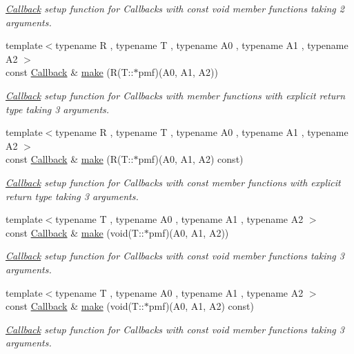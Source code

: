 \begin{DoxyCompactItemize}
\begin{DoxyCompactList}\small\item\em \hyperlink{class_d_d4hep_1_1_callback}{Callback} setup function for Callbacks with const void member functions taking 2 arguments. \item\end{DoxyCompactList}\item 
{\footnotesize template$<$typename R , typename T , typename A0 , typename A1 , typename A2 $>$ }\\const \hyperlink{class_d_d4hep_1_1_callback}{Callback} \& \hyperlink{class_d_d4hep_1_1_callback_a98ec440d07e402f58036a5699dfc2458}{make} (R(T::$\ast$pmf)(A0, A1, A2))
\begin{DoxyCompactList}\small\item\em \hyperlink{class_d_d4hep_1_1_callback}{Callback} setup function for Callbacks with member functions with explicit return type taking 3 arguments. \item\end{DoxyCompactList}\item 
{\footnotesize template$<$typename R , typename T , typename A0 , typename A1 , typename A2 $>$ }\\const \hyperlink{class_d_d4hep_1_1_callback}{Callback} \& \hyperlink{class_d_d4hep_1_1_callback_a747cb5a1ca93ae7b878dfc7e018d0e9b}{make} (R(T::$\ast$pmf)(A0, A1, A2) const)
\begin{DoxyCompactList}\small\item\em \hyperlink{class_d_d4hep_1_1_callback}{Callback} setup function for Callbacks with const member functions with explicit return type taking 3 arguments. \item\end{DoxyCompactList}\item 
{\footnotesize template$<$typename T , typename A0 , typename A1 , typename A2 $>$ }\\const \hyperlink{class_d_d4hep_1_1_callback}{Callback} \& \hyperlink{class_d_d4hep_1_1_callback_aa25f82768896694845261606a1ce386b}{make} (void(T::$\ast$pmf)(A0, A1, A2))
\begin{DoxyCompactList}\small\item\em \hyperlink{class_d_d4hep_1_1_callback}{Callback} setup function for Callbacks with const void member functions taking 3 arguments. \item\end{DoxyCompactList}\item 
{\footnotesize template$<$typename T , typename A0 , typename A1 , typename A2 $>$ }\\const \hyperlink{class_d_d4hep_1_1_callback}{Callback} \& \hyperlink{class_d_d4hep_1_1_callback_a351fc7781de507710ea9a7d1449a6029}{make} (void(T::$\ast$pmf)(A0, A1, A2) const)
\begin{DoxyCompactList}\small\item\em \hyperlink{class_d_d4hep_1_1_callback}{Callback} setup function for Callbacks with const void member functions taking 3 arguments. \item\end{DoxyCompactList}\end{DoxyCompactItemize}
